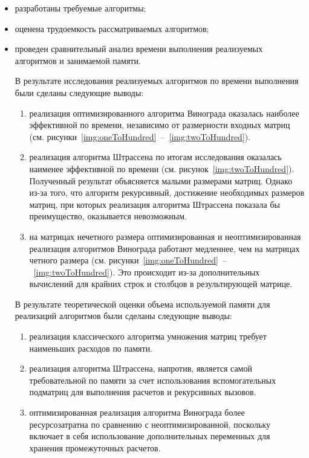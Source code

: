 \begin{itemize}
	\item разработаны требуемые алгоритмы;
	\item оценена трудоемкость рассматриваемых алгоритмов;
	\item проведен сравнительный анализ времени выполнения реализуемых алгоритмов и занимаемой памяти.
	
	В результате исследования реализуемых алгоритмов по времени выполнения были сделаны следующие выводы:
	\begin{enumerate}
		\item реализация оптимизированного алгоритма Винограда оказалась наиболее эффективной по времени, независимо от размерности входных матриц (см. рисунки~\ref{img:oneToHundred}~--~\ref{img:twoToHundred}).
		
		\item реализация алгоритма Штрассена по итогам исследования оказалась наименее эффективной по времени (см. рисунок~\ref{img:twoToHundred}).
		Полученный результат объясняется малыми размерами матриц. Однако из-за того, что алгоритм рекурсивный, достижение необходимых размеров матриц, при которых реализация алгоритма Штрассена показала бы преимущество, оказывается невозможным.
		
		\item на матрицах нечетного размера оптимизированная и неоптимизированная реализация алгоритмов Винограда работают медленнее, чем на матрицах четного размера (см. рисунки~\ref{img:oneToHundred}~--~\ref{img:twoToHundred}). Это происходит из-за дополнительных вычислений для крайних строк и столбцов в результирующей матрице.
	\end{enumerate}
	
	В результате теоретической оценки объема используемой памяти для реализаций 
	алгоритмов были сделаны следующие выводы:
	\begin{enumerate}
		\item реализация классического алгоритма умножения матриц требует наименьших расходов по памяти.
		\item реализация алгоритма Штрассена, напротив, является самой требовательной по памяти за счет использования вспомогательных подматриц для выполнения расчетов и рекурсивных вызовов.
		\item оптимизированная реализация алгоритма Винограда более ресурсозатратна по сравнению с неоптимизированной, поскольку включает в себя использование дополнительных переменных для хранения промежуточных расчетов.
	\end{enumerate}
\end{itemize}